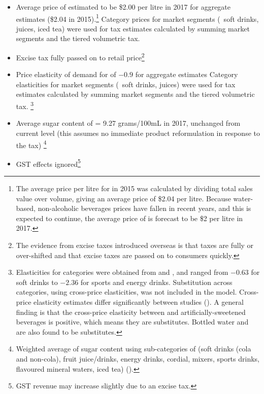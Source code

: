 \documentclass[embargoed]{grattan}
\begin{document}
\begin{itemize}
\item
  Average price of \SSBs{} estimated to be \$2.00 per litre in 2017 for aggregate estimates (\$2.04 in 2015).\footnote{The average price per litre for \SSBs{} in 2015 was calculated by dividing total sales value over volume, giving an average price of \$2.04 per litre.
Because water-based, non-alcoholic beverages prices have fallen in recent years, and this is expected to continue, the average price of \SSBs{} is forecast to be \$2 per litre in 2017.} Category prices for market segments (\eg~soft drinks, juices, iced tea) were used for tax estimates calculated by summing market segments and the tiered volumetric \SSB{} tax.
\item
  Excise tax fully passed on to retail price\footnote{The evidence from \SSB{} excise taxes introduced overseas is that taxes are fully or over-shifted and that excise taxes are passed on to consumers quickly.}
\item
  Price elasticity of demand for \SSBs{} of \(-0.9\) for aggregate estimates
Category elasticities for market segments (\eg~soft drinks, juices) were used for tax estimates calculated by summing market segments and the tiered volumetric \SSB{} tax.%
\footnote{Elasticities for \SSB{} categories were obtained from \textcite{Sharma2014effectstaxingsugarsweetened} and \textcite{Zhen2014Predictingeffectssugar}, and ranged from \(-0.63\) for soft drinks to \(-2.36\) for sports and energy drinks.
Substitution across categories, using cross-price elasticities, was not included in the model.
Cross-price elasticity estimates differ significantly between studies (\textcite{Organization2016FiscalPoliciesDiet}).
A general finding is that the cross-price elasticity between \SSBs{} and artificially-sweetened beverages is positive, which means they are substitutes.
Bottled water and \SSBs{} are also found to be substitutes.}
\item
  Average sugar content of \SSBs{} = 9.27 grams/100mL in 2017, unchanged from current level (this assumes no immediate product reformulation in response to the tax)%
\footnote{Weighted average of sugar content using sub-categories of \SSBs{} (soft drinks (cola and non-cola), fruit juice/drinks, energy drinks, cordial, mixers, sports drinks, flavoured mineral waters, iced tea) (\textcites{rethinksugarydrink2016Howmuchsugar}{HealthCth2014FactSheetHow}).} 
\item
  GST effects ignored\footnote{GST revenue may increase slightly due to an \SSB{} excise tax.}
\end{itemize}
\end{document}
